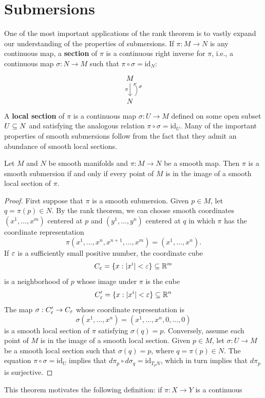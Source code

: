 \section{Submersions}
One of the most important applications of the rank theorem is to vastly expand our
understanding of the properties of submersions. If $\pi:M\to N$ is any continuous
map, a \textbf{section} of $\pi$ is a continuous right inverse for $\pi$, i.e., a continuous map $\sigma:N\to M$ such that $\pi\circ\sigma=\mathrm{id}_N$:
\[\begin{tikzcd}
M\ar[d,swap,"\pi"]\\
N\ar[u,swap,bend right=40,"\sigma"]
\end{tikzcd}\]
A \textbf{local section} of $\pi$ is a continuous map $\sigma:U\to M$ defined on some open subset $U\subseteq N$ and satisfying the analogous relation $\pi\circ\sigma=\mathrm{id}_U$. Many of the important properties of smooth submersions follow from the fact that they admit an abundance of smooth local sections.
\begin{theorem}\label{submersion iff local section}
Let $M$ and $N$ be smooth manifolds and $\pi:M\to N$ be a smooth map. Then $\pi$ is a smooth submersion if and only if every point of $M$ is in the image of a smooth local section of $\pi$.
\end{theorem}
\begin{proof}
First suppose that $\pi$ is a smooth submersion. Given $p\in M$, let $q=\pi(p)\in N$. By the rank theorem, we can choose smooth coordinates $(x^1,\dots,x^m)$ centered at $p$ and $(y^1,\dots,y^n)$ centered at $q$ in which $\pi$ has the coordinate representation
\[\pi(x^1,\dots,x^n,x^{n+1},\dots,x^m)=(x^1,\dots,x^n).\]
If $\varepsilon$ is a sufficiently small positive number, the coordinate cube
\[C_\varepsilon=\{x:|x^i|<\varepsilon\}\subseteq\mathbb{R}^m\]
is a neighborhood of $p$ whose image under $\pi$ is the cube
\[C'_\varepsilon=\{x:|x^i|<\varepsilon\}\subseteq\mathbb{R}^n\]
The map $\sigma:C'_\varepsilon\to C_\varepsilon$ whose coordinate representation is
\[\sigma(x^1,\dots,x^n)=(x^1,\dots,x^n,0,\dots,0)\]
is a smooth local section of $\pi$ satisfying $\sigma(q)=p$. Conversely, assume each point of $M$ is in the image of a smooth local section. Given $p\in M$, let $\sigma:U\to M$ be a smooth local section such that $\sigma(q)=p$, where $q=\pi(p)\in N$. The equation $\pi\circ\sigma=\mathrm{id}_U$ implies that $d\pi_p\circ d\sigma_q=\mathrm{id}_{T_pN}$, which in turn implies that $d\pi_p$ is surjective.
\end{proof}
This theorem motivates the following definition: if $\pi:X\to Y$ is a continuous

